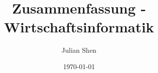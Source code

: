 \documentclass[12pt,a4paper,titlepage]{scrartcl}
\title{Zusammenfassung - Wirtschaftsinformatik}
\author{Julian Shen}
\date{\today}
\begin{document}
	\maketitle
	\pagebreak
	
\end{document}
